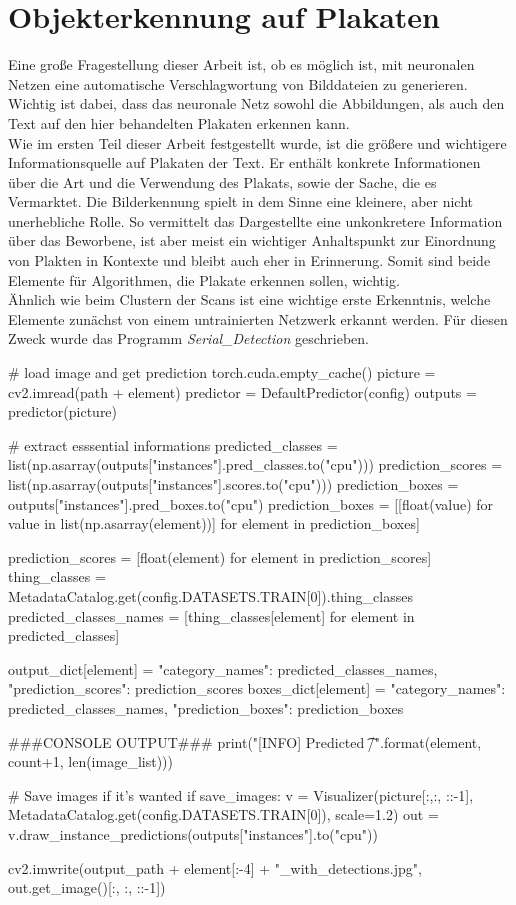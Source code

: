 \documentclass[a4paper,12pt,ngerman]{article}
\begin{document}
\section{Objekterkennung auf Plakaten}

Eine große Fragestellung dieser Arbeit ist, ob es möglich ist, mit neuronalen Netzen eine automatische Verschlagwortung von Bilddateien zu generieren. Wichtig ist dabei, dass das neuronale Netz sowohl die Abbildungen, als auch den Text auf den hier behandelten Plakaten erkennen kann. \\
Wie im ersten Teil dieser Arbeit festgestellt wurde, ist die größere und wichtigere Informationsquelle auf Plakaten der Text. Er enthält konkrete Informationen über die Art und die Verwendung des Plakats, sowie der Sache, die es Vermarktet. Die Bilderkennung spielt in dem Sinne eine kleinere, aber nicht unerhebliche Rolle. So vermittelt das Dargestellte eine unkonkretere Information über das Beworbene, ist aber meist ein wichtiger Anhaltspunkt zur Einordnung von Plakten in Kontexte und bleibt auch eher in Erinnerung. Somit sind beide Elemente für Algorithmen, die Plakate erkennen sollen, wichtig. \\

Ähnlich wie beim Clustern der Scans ist eine wichtige erste Erkenntnis, welche Elemente zunächst von einem untrainierten Netzwerk erkannt werden. Für diesen Zweck wurde das Programm \textit{Serial\_Detection} geschrieben. \\

\begin{python}
	# load image and get prediction
	torch.cuda.empty_cache()
	picture = cv2.imread(path + element)
	predictor = DefaultPredictor(config)
	outputs = predictor(picture)

	# extract esssential informations
	predicted_classes = list(np.asarray(outputs["instances"].pred_classes.to("cpu")))
	prediction_scores = list(np.asarray(outputs["instances"].scores.to("cpu")))
	prediction_boxes = outputs["instances"].pred_boxes.to("cpu")
	prediction_boxes = [[float(value) for value in list(np.asarray(element))] for element in prediction_boxes]

	prediction_scores = [float(element) for element in prediction_scores]
	thing_classes = MetadataCatalog.get(config.DATASETS.TRAIN[0]).thing_classes
	predicted_classes_names = [thing_classes[element] for element in predicted_classes]
	
	output_dict[element] = {"category_names": predicted_classes_names, "prediction_scores": prediction_scores}
	boxes_dict[element] = {"category_names": predicted_classes_names, "prediction_boxes": prediction_boxes}

	###CONSOLE OUTPUT###
	print("[INFO] Predicted {}\t{}/{}".format(element, count+1, len(image_list)))

	# Save images if it's wanted
	if save_images:
		v = Visualizer(picture[:,:, ::-1], MetadataCatalog.get(config.DATASETS.TRAIN[0]), scale=1.2)
		out = v.draw_instance_predictions(outputs["instances"].to("cpu"))

		cv2.imwrite(output_path + element[:-4] + "_with_detections.jpg", out.get_image()[:, :, ::-1])
\end{python}
\end{document}
